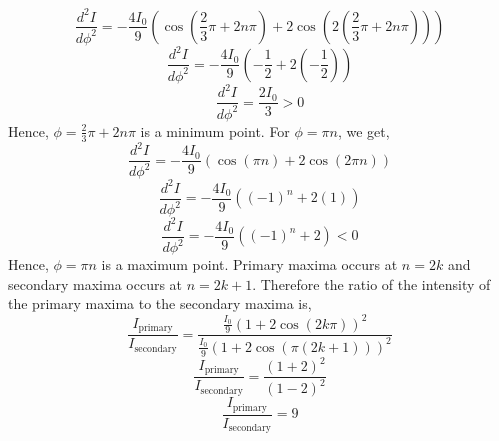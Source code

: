 \documentclass{article}
\begin{document}
\begin{problem}[Intensity]
\begin{enumerate}
	      \[\frac{d^2I}{d\phi^2} = -\frac{4I_0}{9}\left(\cos{\left(\frac{2}{3}\pi+2n\pi\right)}+2\cos{\left(2\left(\frac{2}{3}\pi+2n\pi\right)\right)}\right)\]
	      \[\frac{d^2I}{d\phi^2} = -\frac{4I_0}{9}\left(-\frac{1}{2}+2\left(-\frac{1}{2}\right)\right)\]
	      \[\frac{d^2I}{d\phi^2} = \frac{2I_0}{3}>0\]
	      Hence, \(\phi=\frac{2}{3}\pi+2n\pi\) is a minimum point. For \(\phi=\pi n\), we get,
	      \[\frac{d^2I}{d\phi^2} = -\frac{4I_0}{9}\left(\cos{\left(\pi n\right)}+2\cos{\left(2\pi n\right)}\right)\]
	      \[\frac{d^2I}{d\phi^2} = -\frac{4I_0}{9}\left((-1)^n+2\left(1\right)\right)\]
	      \[\frac{d^2I}{d\phi^2} = -\frac{4I_0}{9}\left((-1)^n+2\right)<0\]
	      Hence, \(\phi=\pi n\) is a maximum point. Primary maxima occurs at \(n=2k\) and secondary maxima occurs at \(n=2k+1\). Therefore the ratio of the intensity of the primary maxima to the secondary maxima is,
	      \[\frac{I_{\text{primary}}}{I_{\text{secondary}}} = \frac{\frac{I_0}{9}\left(1+2\cos{\left(2k\pi\right)}\right)^2}{\frac{I_0}{9}\left(1+2\cos{\left(\pi\left(2k+1\right)\right)}\right)^2}\]
	      \[\frac{I_{\text{primary}}}{I_{\text{secondary}}} = \frac{\left(1+2\right)^2}{\left(1-2\right)^2}\]
	      \[\frac{I_{\text{primary}}}{I_{\text{secondary}}} = 9\]
\end{enumerate}

\end{problem}
\end{document}
